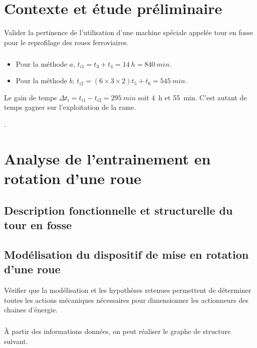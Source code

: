 \documentclass[10pt,fleqn]{article} %
\begin{document}

\vspace{4.5cm}
\pagestyle{fancy}
\thispagestyle{plain}


\def\columnseprulecolor{\color{ocre}}
\setlength{\columnseprule}{0.4pt} 

\section{Contexte et étude préliminaire}

\begin{obj}
Valider la pertinence de l’utilisation d’une machine spéciale appelée tour en fosse pour le reprofilage
des roues ferroviaires.
\end{obj}

\subparagraph{}

\begin{itemize}
\item Pour la méthode $a$, $t_{i1} = t_3 +t_4 = \SI{14}{h}= \SI{840}{min}$.
\item Pour la méthode $b$, $t_{i2} = \left( 6\times 3 \times 2 \right)t_5 +t_6 = \SI{545}{min}$.
\end{itemize}

Le gain de temps $\Delta t_i = t_{i1}-t_{i2}=\SI{295}{min}$ soit \SI{4}{h} et \SI{55}{min}. C'est autant de temps gagner sur l'exploitation de la rame. 


.

\section{Analyse de l’entrainement en rotation d’une roue}
\subsection{Description fonctionnelle et structurelle du tour en fosse}
\subsection{Modélisation du dispositif de mise en rotation d’une roue}


\begin{obj}
Vérifier que la modélisation et les hypothèses retenues permettent de déterminer toutes les actions mécaniques nécessaires pour dimensionner les actionneurs des chaines d’énergie.
\end{obj}

\subparagraph{}
À partir des informations données, on peut réaliser le graphe de structure suivant. 
\end{document}
